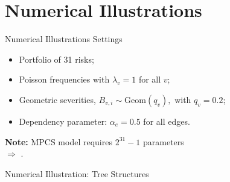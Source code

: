 \documentclass[11pt,xcolor={dvipsnames},hyperref={pdftex,pdfpagemode=UseNone,hidelinks,pdfdisplaydoctitle=true},usepdftitle=false]{beamer}
\begin{document}
\section{Numerical Illustrations}
\begin{frame}{Numerical Illustrations Settings}
\begin{itemize}
    \item Portfolio of 31 risks;
    \item Poisson frequencies with $\lambda_v = 1$ for all $v$;
    \item Geometric severities, $B_{v,i} \sim \text{Geom}(q_v),$ with $q_v  = 0.2$;
    \item Dependency parameter: $\alpha_e = 0.5$ for all edges.
\end{itemize}
\begin{center}
% 

\end{center}
\pause
\begin{center}
    {\textbf{Note:} MPCS model requires $2^{31} - 1$ parameters\\
    $\Rightarrow$ .}
\end{center}
\end{frame}

\begin{frame}{Numerical Illustration: Tree Structures}
\begin{center}
\vfill
{}
\vfill

\end{center}
\end{frame}
\end{document}
